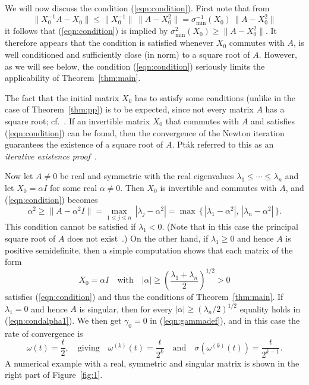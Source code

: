 \documentclass{siamltex}
\begin{document}
\medskip
We will now discuss the condition (\ref{eqn:condition}). First note that from
$$\|X_0^{-1}A-X_0\|\leq \|X_0^{-1}\|\,\|A-X_0^2\|=\sigma_{\min}^{-1}(X_0)\,\|A-X_0^2\|$$
it follows that (\ref{eqn:condition}) is implied by
$ \sigma_{\min}^2(X_0)\geq \|A-X_0^2\|$. It therefore appears that the condition is
satisfied whenever $X_0$ commutes with $A$, is well conditioned and sufficiently
close (in norm) to a square root of $A$. However, as we will see below, the condition
(\ref{eqn:condition}) seriously limits the applicability of Theorem~\ref{thm:main}.

The fact that the initial matrix $X_0$ has to satisfy some conditions (unlike in the
case of Theorem~\ref{thm:pp}) is to be expected, since not every matrix $A$ has
a square root; cf.~\cite[Section~1.5]{HigBook08}. If an invertible matrix $X_0$ that
commutes with $A$ and satisfies (\ref{eqn:condition}) can be found, then the convergence
of the Newton iteration guarantees the existence of a square root of $A$.  Pt\'ak referred
to this as an {\em iterative existence proof}~\cite{Pta76b}.

Now let $A\neq 0$ be real and symmetric with the real eigenvalues $\lambda_1\leq\cdots\leq\lambda_n$
and let $X_0=\alpha I$ for some real $\alpha\neq 0$. Then $X_0$ is invertible and
commutes with $A$, and (\ref{eqn:condition}) becomes
\begin{equation}\label{eqn:condalpha1}
\alpha^2\geq \|A-\alpha^2 I\| = \max_{1\leq j\leq n}\,|\lambda_j-\alpha^2| =
\max\,\{\,|\lambda_1-\alpha^2|,\,|\lambda_n-\alpha^2|\,\}.
\end{equation}
This condition cannot be satisfied if $\lambda_1<0$. (Note that in this case the principal 
square root of $A$ does not exist~\cite[Theorem~1.29]{HigBook08}.) 
On the other hand, if $\lambda_1\geq 0$
and hence $A$ is positive semidefinite, then a simple computation shows that each matrix
of the form
\begin{equation}\label{eqn:X0}
X_0=\alpha I\quad\mbox{with}\quad |\alpha|\geq \left(\frac{\lambda_1+\lambda_n}{2}\right)^{1/2}>0
\end{equation}
satisfies (\ref{eqn:condition}) and thus the conditions of Theorem~\ref{thm:main}. If $\lambda_1=0$
and hence $A$ is singular, then for every $|\alpha|\geq (\lambda_n/2)^{1/2}$ equality holds in
(\ref{eqn:condalpha1}). We then get $\gamma_0=0$ in (\ref{eqn:gammadef}), 
and in this case the rate of convergence is
\begin{equation}\label{eqn:singular}
\omega(t)=\frac{t}{2},\quad\mbox{giving}\quad \omega^{(k)}(t)=\frac{t}{2^k}\quad \mbox{and}\quad
\sigma(\omega^{(k)}(t))=\frac{t}{2^{k-1}}.
\end{equation}
A numerical example with a real, symmetric and singular matrix is shown in the right part 
of Figure~\ref{fig:1}.
\end{document}
